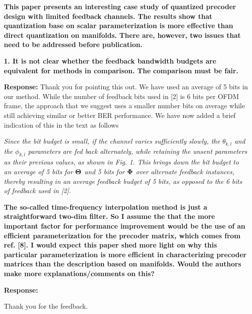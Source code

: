 \documentclass[12pt]{letter}
\begin{document}
\textbf{This paper presents an interesting case study of quantized
  precoder design with limited feedback channels. The results show
  that quantization base on scalar parameterization is more effective
  than direct quantization on manifolds. There are, however, two
  issues that need to be addressed before publication.}

\textbf{1. It is not clear whether the feedback bandwidth budgets are
equivalent for methods in comparison. The comparison must be fair.}

\textbf{Response:} Thank you for pointing this out. We have used an
average of 5 bits in our method. While the number of feedback bits
used in [2] is 6 bits per OFDM frame, the approach that we suggest
uses a smaller number bits on average while still achieving similar or
better BER performance. We have now added a brief indication of this
in the text as follows

\emph{Since the bit budget is small, if the channel varies
sufficiently slowly, the $\theta_{k,l}$ and the $\phi_{k,l}$ parameters
are fed back alternately, while retaining the unsent parameters as
their previous values, as shown in
Fig. 1. This brings down the bit budget to an average of 5 bits for
$\bf{\Theta}$ and 5 bits for $\bf{\Phi}$ over alternate feedback
instances, thereby resulting in an average feedback budget of 5 bits,
as opposed to the 6 bits of feedback used
in [2].}

\textbf{ The so-called time-frequency interpolation method is just a
  straightforward two-dim filter. So I assume the that the more
  important factor for performance improvement would be the use of an
  efficient parameterization for the precoder matrix, which comes from
  ref. [8]. I would expect this paper shed more light on why this
  particular parameterization is more efficient in characterizing
  precoder matrices than the description based on manifolds.  Would
  the authors make more explanations/comments on this?}

\textbf{Response:}

Thank you for the feedback.
\end{document}
